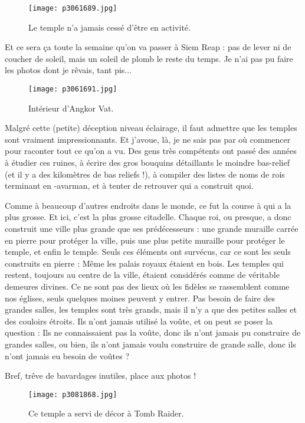 \documentclass{book}
\begin{document}
\begin{figure}[h]
\centering
\texttt{[image: p3061689.jpg]}
\caption*{Le temple n'a jamais cessé d'être en activité.}
\end{figure}

Et ce sera ça toute la semaine qu'on va passer à Siem Reap :  pas de lever ni de coucher de soleil, mais un soleil de plomb le reste du temps. Je n'ai pas pu faire les photos dont je rêvais, tant pis...


\begin{figure}[h]
\centering
\texttt{[image: p3061691.jpg]}
\caption*{Intérieur d'Angkor Vat.}
\end{figure}

Malgré cette (petite) déception niveau éclairage, il faut admettre que les temples sont vraiment impressionnants. Et j'avoue, là, je ne sais pas par où commencer pour raconter tout ce qu'on a vu. Des gens très compétents ont passé des années à étudier ces ruines, à écrire des gros bouquins détaillants le moindre bas-relief (et il y a des kilomètres de bas reliefs !), à compiler des listes de noms de rois terminant en -avarman, et à tenter de retrouver qui a construit quoi.

Comme à beaucoup d'autres endroits dans le monde, ce fut la course à qui a la plus grosse. Et ici, c'est la plus grosse citadelle. Chaque roi, ou presque, a donc construit une ville plus grande que ses prédécesseurs : une grande muraille carrée en pierre pour protéger la ville, puis une plus petite muraille pour protéger le temple, et enfin le temple. Seuls ces éléments ont survécus, car ce sont les seuls construits en pierre : Même les palais royaux étaient en bois. Les temples qui restent, toujours au centre de la ville, étaient considérés comme de véritable demeures divines. Ce ne sont pas des lieux où les fidèles se rassemblent comme nos églises, seuls quelques moines peuvent y entrer. Pas besoin de faire des grandes salles, les temples sont très grands, mais il n'y a que des petites salles et des couloirs étroits. Ils n'ont jamais utilisé la voûte, et on peut se poser la question : Ils ne connaissaient pas la voûte, donc ils n'ont jamais pu construire de grandes salles, ou bien, ils n'ont jamais voulu construire de grande salle, donc ils n'ont jamais eu besoin de voûtes ?

Bref, trêve de bavardages inutiles, place aux photos !


\begin{figure}[h]
\centering
\texttt{[image: p3081868.jpg]}
\caption*{Ce temple a servi de décor à Tomb Raider.}
\end{figure}
\end{document}

